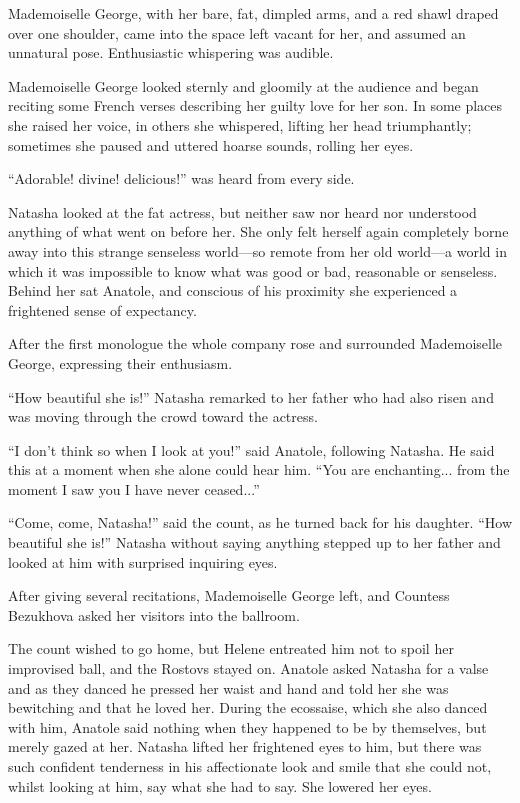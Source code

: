 Mademoiselle George, with her bare, fat, dimpled arms, and a red
shawl draped over one shoulder, came into the space left vacant
for her, and assumed an unnatural pose. Enthusiastic whispering
was audible.

Mademoiselle George looked sternly and gloomily at the audience
and began reciting some French verses describing her guilty love
for her son. In some places she raised her voice, in others she
whispered, lifting her head triumphantly; sometimes she paused
and uttered hoarse sounds, rolling her eyes.

``Adorable! divine! delicious!'' was heard from every side.

Natasha looked at the fat actress, but neither saw nor heard nor
understood anything of what went on before her. She only felt
herself again completely borne away into this strange senseless
world---so remote from her old world---a world in which it was
impossible to know what was good or bad, reasonable or
senseless. Behind her sat Anatole, and conscious of his proximity
she experienced a frightened sense of expectancy.

After the first monologue the whole company rose and surrounded
Mademoiselle George, expressing their enthusiasm.

``How beautiful she is!'' Natasha remarked to her father who had
also risen and was moving through the crowd toward the actress.

``I don't think so when I look at you!'' said Anatole, following
Natasha.  He said this at a moment when she alone could hear
him. ``You are enchanting... from the moment I saw you I have
never ceased...''

``Come, come, Natasha!'' said the count, as he turned back for
his daughter. ``How beautiful she is!'' Natasha without saying
anything stepped up to her father and looked at him with
surprised inquiring eyes.

After giving several recitations, Mademoiselle George left, and
Countess Bezukhova asked her visitors into the ballroom.

The count wished to go home, but Helene entreated him not to
spoil her improvised ball, and the Rostovs stayed on. Anatole
asked Natasha for a valse and as they danced he pressed her waist
and hand and told her she was bewitching and that he loved
her. During the ecossaise, which she also danced with him,
Anatole said nothing when they happened to be by themselves, but
merely gazed at her. Natasha lifted her frightened eyes to him,
but there was such confident tenderness in his affectionate look
and smile that she could not, whilst looking at him, say what she
had to say. She lowered her eyes.

